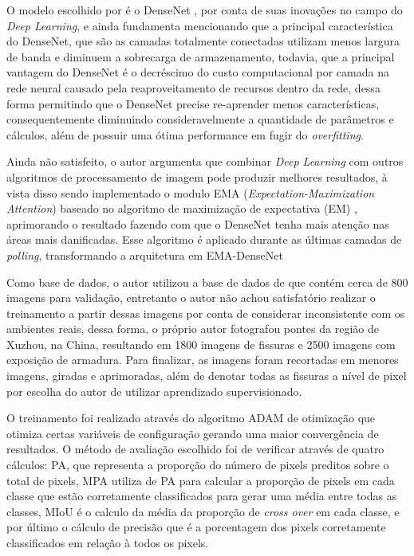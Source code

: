O modelo escolhido por  é o DenseNet \cite{huang2017densely}, por conta de suas inovações no campo do \textit{Deep Learning}, e ainda fundamenta mencionando que a principal característica do DenseNet, que são as camadas totalmente conectadas utilizam menos largura de banda e diminuem a sobrecarga de armazenamento, todavia, que a principal vantagem do DenseNet é o decréscimo do custo computacional por camada na rede neural causado pela reaproveitamento de recursos dentro da rede, dessa forma permitindo que o DenseNet precise re-aprender menos características, consequentemente diminuindo consideravelmente a quantidade de parâmetros e cálculos, além de possuir uma ótima performance em fugir do \textit{overfitting}.

Ainda não satisfeito, o autor argumenta que combinar \textit{Deep Learning} com outros algoritmos de processamento de imagem pode produzir melhores resultados, à vista disso sendo implementado o modulo EMA (\textit{Expectation-Maximization Attention}) baseado no algoritmo de maximização de expectativa (EM) \cite{li2019expectation}, aprimorando o resultado fazendo com que o DenseNet tenha mais atenção nas áreas mais danificadas. 
Esse algoritmo é aplicado durante as últimas camadas de \textit{polling}, transformando a arquitetura em EMA-DenseNet

Como base de dados, o autor utilizou a base de dados de  que contém cerca de 800 imagens para validação, entretanto o autor não achou satisfatório realizar o treinamento a partir dessas imagens por conta de considerar inconsistente com os ambientes reais, dessa forma, o próprio autor fotografou pontes da região de Xuzhou, na China, resultando em 1800 imagens de fissuras e  2500 imagens com exposição de armadura.
Para finalizar, as imagens foram recortadas em menores imagens, giradas e aprimoradas, além de denotar todas as fissuras a nível de pixel por escolha do autor de utilizar aprendizado supervisionado.

O treinamento foi realizado através do algoritmo ADAM de otimização \cite{kingma2014adam} que otimiza certas variáveis de configuração gerando uma maior convergência de resultados. O método de avaliação escolhido foi de verificar através de quatro cálculos: 
PA, que representa a proporção do número de pixels preditos sobre o total de pixels, 
MPA utiliza de PA para calcular a proporção de pixels em cada classe que estão corretamente classificados para gerar uma média entre todas as classes, 
MIoU é o calculo da média da proporção de \textit{cross over} em cada classe, 
e por último o cálculo de precisão que é a porcentagem dos pixels corretamente classificados em relação à todos os pixels.

